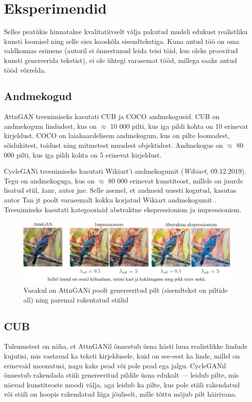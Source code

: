 \documentclass{vilgym}
\begin{document}
	\section{Eksperimendid}
	Selles peatükis hinnatakse kvalitatiivselt välja pakutud mudeli edukust realistliku kunsti loomisel ning selle sisu kooskõla sisendtekstiga. Kuna antud töö on oma valdkonnas esimene (autoril ei õnnestunud leida teisi töid, kus oleks proovitud kunsti genereerida tekstist), ei ole ühtegi varasemat tööd, millega saaks antud tööd võrrelda.

	\subsection{Andmekogud}
	AttnGAN treenimiseks kasutati CUB \parencite{cub} ja COCO \parencite{srgan} andmekogusid. CUB on andmekogum lindudest, kus on $\approx$ 10 000 pilti, kus iga pildi kohta on 10 erinevat kirjeldust. COCO on laiahaardelisem andmekogum, kus on pilte loomadest, sõidukitest, toidust ning mitmetest muudest objektidest. Andmekogus on $\approx$ 80 000 pilti, kus iga pildi kohta on 5 erinevat kirjeldust.

	CycleGANi treenimiseks kasutati Wikiart'i andmekogumit (\textit{Wikiart}, 09.12.2019). Tegu on andmekoguga, kus on $\approx$ 80 000 erinevat kunstiteost, millele on juurde lisatud stiil, žanr, autor jne. Selle asemel, et andmeid uuesti kogutud, kasutas autor Tan jt poolt varasemalt kokku korjatud Wikiart andmekogumit \parencite{artgan}. Treenimiseks kasutati kategooriaid abstraktne ekspressionism ja impressionism.

	\begin{figure}
		\includegraphics[width=\linewidth]{images/linnud.jpg}
		\caption{Vasakul on AttnGANi poolt genereeritud pilt (sisendtekst on piltide all) ning paremal rakentatud stiilid}
		\label{fig:cub}
	\end{figure}

	\subsection{CUB}
	Tulemustest on näha, et AttnGANil õnnestub üsna hästi luua realistlikke lindude kujutisi, mis vastavad ka teksti kirjeldusele, kuid on see-eest ka linde, millel on erinevaid moonutusi, nagu kaks pead või pole pead ega jalgu. CycleGANil õnnestub rakendada stiili genereeritud pildile üsna edukalt  --- leidub pilte, mis näevad kunstiteoste moodi välja, aga leidub ka pilte, kus pole stiili rakendatud või stiili on hoopis rakendatud liiga jõuliselt, mille tõttu mõjub pilt häirivana.
\end{document}
